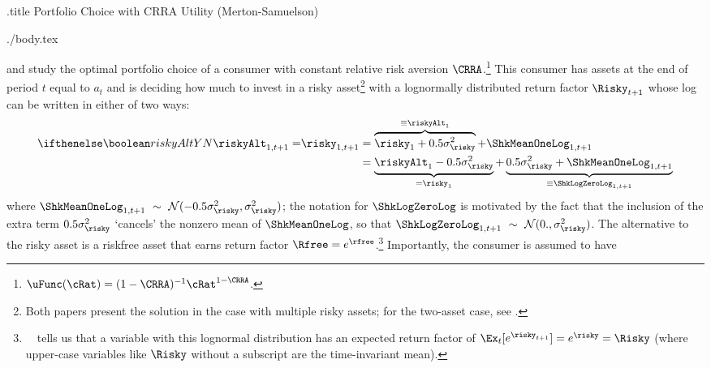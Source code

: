 \documentclass{handout}
\begin{document}
\handoutHeader

\begin{verbatimwrite}{\jobname.title}
Portfolio Choice with CRRA Utility (Merton-Samuelson)
\end{verbatimwrite}
\medskip\medskip\medskip

\handoutNameMake
\begin{verbatimwrite}{./body.tex}

\newcommand{\scale}{x}

\cite{merton:restat} and \cite{samuelson:portfolio} study the optimal portfolio choice of a consumer with constant relative risk aversion $\CRRA$.\footnote{$\uFunc(\cRat) = (1-\CRRA)^{-1}\cRat^{1-\CRRA}$.}  This consumer has assets at the end of period $t$ equal to $a_{t}$ and is deciding how much to invest in a risky asset\footnote{Both papers present the solution in the case with multiple risky assets; for the two-asset case, see .} with a lognormally distributed return factor $\Risky_{t+1}$ whose log can be written in either of two ways:
\begin{equation}\begin{gathered}\begin{aligned}
    \ifriskyAlt{\riskyAlt_{1,t+1} = }{}      \risky_{1,t+1}  & =  \overbrace{\risky_{1}+0.5\sigma^{2}_{\risky}}^{\equiv \riskyAlt_{1}}+\ShkMeanOneLog_{1,t+1}
\\   & =  \underbrace{\riskyAlt_{1}-0.5\sigma^{2}_{\risky}}_{=\risky_{1}}+\underbrace{0.5\sigma^{2}_{\risky}+\ShkMeanOneLog_{1,t+1}}_{\equiv \ShkLogZeroLog_{1,t+1}}
\end{aligned}\end{gathered}\end{equation}
where $\ShkMeanOneLog_{1,t+1}~\sim~\mathcal{N}(-0.5 \sigma^{2}_{\risky},\sigma^{2}_{\risky})$; the notation for $\ShkLogZeroLog$ is motivated by the fact that the inclusion of the extra term $0.5\sigma^{2}_{\risky}$ `cancels' the nonzero mean of $\ShkMeanOneLog$, so that $\ShkLogZeroLog_{1,t+1}~\sim~\mathcal{N}(0.,\sigma^{2}_{\risky})$.  
The alternative to the risky asset is a riskfree asset that earns return factor
  $\Rfree=e^{\rfree}$.\footnote{\MathFactsList~\ELogNorm~tells us that a variable with this lognormal distribution has an
    expected return factor of
    $\Ex_{t}[e^{\risky_{t+1}}]=e^{\risky}=\Risky$ (where upper-case variables
    like $\Risky$ without a subscript are the time-invariant mean).}  Importantly, the consumer is assumed to have

\end{verbatimwrite}
\end{document}
